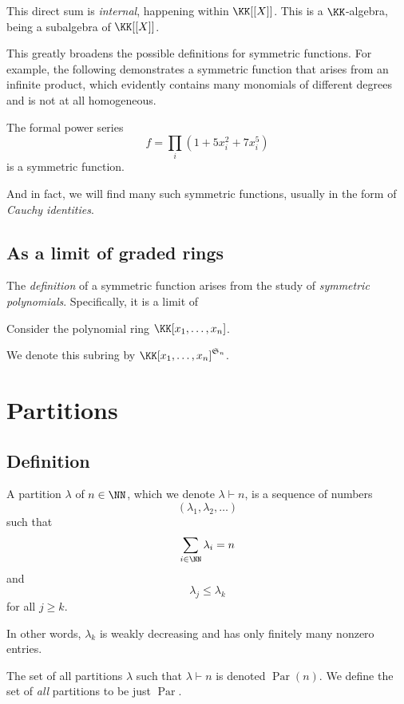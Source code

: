 \documentclass{article}
\DeclareMathOperator{\Par}{Par}
\newcommand{\frkS}{\ensuremath\mathfrak{S}}
\begin{document}
This direct sum is \textit{internal}, happening within $\KK[[X]]$. 
This is a $\KK$-algebra, being a subalgebra of $\KK[[X]]$.

This greatly broadens the possible definitions for symmetric functions. 
For example, the following demonstrates a symmetric function that arises from an infinite product, which evidently contains many monomials of different degrees and is not at all homogeneous.

\begin{example}
    The formal power series 
    \[
        f = \prod_i (1 + 5x_i^2 + 7x_i^5)
    \]
    is a symmetric function.
\end{example}

And in fact, we will find many such symmetric functions, usually in the form of \textit{Cauchy identities}.


\subsection{As a limit of graded rings}

The \textit{definition} of a symmetric function arises from the study of \textit{symmetric polynomials}. Specifically, it is a limit of

Consider the polynomial ring $\KK[x_1,\ldots,x_n]$.

We denote this subring by $\KK[x_1,\ldots,x_n]^{\frkS_n}$.


\section{Partitions}
\subsection{Definition}
\begin{definition}
    A partition $\lambda$ of $n \in \NN$, which we denote $\lambda \vdash n$, is a sequence of numbers 
    \[
        (\lambda_1,\lambda_2,\ldots)
    \]
    such that 
    \[
        \sum_{i\in\NN}\lambda_i = n
    \]
    and 
    \[
        \lambda_j \leq \lambda_k
    \]
    for all $j\geq k$.
\end{definition}

In other words, $\lambda_k$ is weakly decreasing and has only finitely many nonzero entries. 

The set of all partitions $\lambda$ such that $\lambda \vdash n$ is denoted $\Par(n)$. We define the set of \textit{all} partitions to be just $\Par$.
\end{document}
